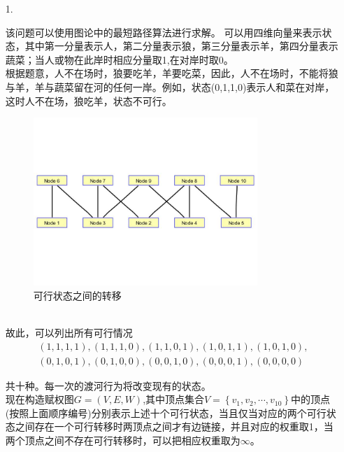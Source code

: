 \documentclass[a4paper,20pt]{article}
\title{}
\author{}
\date{}
\begin{document}
\renewcommand{\lstlistlistingname}{代码汇总}
\renewcommand{\lstlistingname}{代码}
\renewcommand\tablename{表}

\begin{itemize}
    \item[1.]
        \par  该问题可以使用图论中的最短路径算法进行求解。
        可以用四维向量来表示状态，其中第一分量表示人，第二分量表示狼，第三分量表示羊，第四分量表示蔬菜；当人或物在此岸时相应分量取1,在对岸时取0。
        \\根据题意，人不在场时，狼要吃羊，羊要吃菜，因此，人不在场时，不能将狼与羊，羊与蔬菜留在河的任何一岸。例如，状态(0,1,1,0)表示人和菜在对岸，这时人不在场，狼吃羊，状态不可行。
        \begin{figure}[h]
            \begin{center}
                \includegraphics[width=0.80\textwidth]{homework1.jpg}
                \caption{可行状态之间的转移}
            \end{center}
        \end{figure}
        \\故此，可以列出所有可行情况
        \begin{equation}
            \begin{aligned}
                (1,1,1,1),(1,1,1,0),(1,1,0,1),(1,0,1,1),(1,0,1,0), \\
                (0,1,0,1),(0,1,0,0),(0,0,1,0),(0,0,0,1),(0,0,0,0)
            \end{aligned}
        \end{equation}
        \par \noindent 共十种。每一次的渡河行为将改变现有的状态。
        \\现在构造赋权图$G=(V,E,W)$,其中顶点集合$V=\left\{v_1,v_2,\cdots,v_10\right\}$中的顶点(按照上面顺序编号)分别表示上述十个可行状态，当且仅当对应的两个可行状态之间存在一个可行转移时两顶点之间才有边链接，并且对应的权重取1，当两个顶点之间不存在可行转移时，可以把相应权重取为$\infty$。

\end{itemize}
\end{document}
